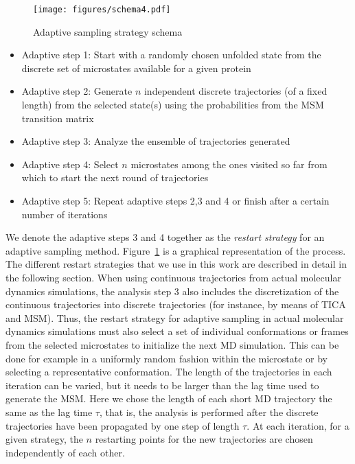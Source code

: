 \begin{figure}[!ht]
  \centering
  \texttt{[image: figures/schema4.pdf]}
  \caption{Adaptive sampling strategy schema}
  \label{fig:schema}
\end{figure}

\begin{itemize}
\item Adaptive step 1: Start with a randomly chosen unfolded state from the discrete set of microstates available for a given protein
\item Adaptive step 2: Generate $n$ independent discrete trajectories (of a fixed length) from the selected state(s)
using the probabilities from the MSM transition matrix 
\item Adaptive step 3: Analyze the ensemble of trajectories generated
\item Adaptive step 4: Select $n$  microstates among the ones visited so far from which to start the next round of trajectories 
\item Adaptive step 5: Repeat adaptive steps 2,3 and 4 or finish after a certain number of iterations

\end{itemize}

We denote the adaptive steps 3 and 4 together as the \emph{restart strategy} for an
adaptive sampling method. Figure~\ref{fig:schema} is a graphical representation
of the process. The different restart strategies that we use in this work are
described in detail in the following section. When using continuous trajectories from actual molecular dynamics simulations,
the analysis step 3 also includes the discretization of the continuous
trajectories into discrete trajectories (for instance, by means of TICA and MSM).
Thus, the restart strategy for adaptive sampling in actual molecular dynamics
simulations must also select a set of individual conformations or frames from the selected
microstates to initialize the next MD simulation. This can be done for example in
a uniformly random fashion within the microstate or by selecting a representative
conformation. 
The length of the trajectories in each iteration can be varied, but it needs to
be larger than the lag time used to generate the MSM.
Here we chose the length of each short MD trajectory the same as the lag time
$\tau$, that is, the analysis is performed after the discrete trajectories have
been propagated by one step of length $\tau$. 
At each iteration, for a given strategy, the $n$ restarting points for the new
trajectories are chosen independently of each other.

